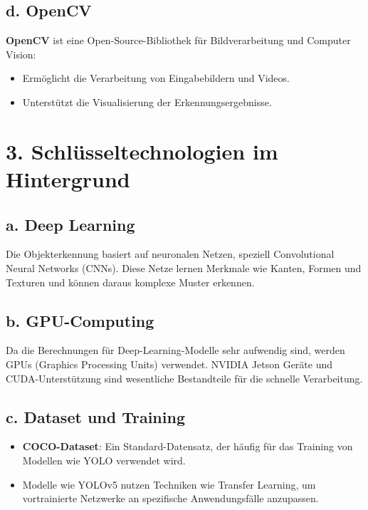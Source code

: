 \documentclass{article}
\begin{document}
\subsection*{d. OpenCV}
\textbf{OpenCV} ist eine Open-Source-Bibliothek für Bildverarbeitung und Computer Vision:
\begin{itemize}
    \item Ermöglicht die Verarbeitung von Eingabebildern und Videos.
    \item Unterstützt die Visualisierung der Erkennungsergebnisse.
\end{itemize}

\section*{3. Schlüsseltechnologien im Hintergrund}

\subsection*{a. Deep Learning}
Die Objekterkennung basiert auf neuronalen Netzen, speziell Convolutional Neural Networks (CNNs). Diese Netze lernen Merkmale wie Kanten, Formen und Texturen und können daraus komplexe Muster erkennen.

\subsection*{b. GPU-Computing}
Da die Berechnungen für Deep-Learning-Modelle sehr aufwendig sind, werden GPUs (Graphics Processing Units) verwendet. NVIDIA Jetson Geräte und CUDA-Unterstützung sind wesentliche Bestandteile für die schnelle Verarbeitung.

\subsection*{c. Dataset und Training}
\begin{itemize}
    \item \textbf{COCO-Dataset}: Ein Standard-Datensatz, der häufig für das Training von Modellen wie YOLO verwendet wird.
    \item Modelle wie YOLOv5 nutzen Techniken wie Transfer Learning, um vortrainierte Netzwerke an spezifische Anwendungsfälle anzupassen.
\end{itemize}
\end{document}
